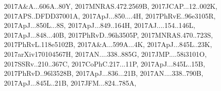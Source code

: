 \documentclass[12pt]{article}
\begin{document}
\begin{description}
{2017A&A...606A..80Y,%
2017MNRAS.472.2569B,%
2017JCAP...12..002K,%
2017APS..DFDD37001A,%
2017ApJ...850....4H,%
2017PhRvE..96e3105R,%
2017ApJ...850L...8S,%
2017ApJ...849..164H,%
2017AJ....154..146L,%
2017ApJ...848...40B,%
2017PhRvD..96h3505P,%
2017MNRAS.470..723S,%
2017PhRvL.118e5102B,%
2017A&A...599A...4K,%
2017ApJ...845L..23K,%
2017arXiv170104567H,%
2017AN....338..885G,%
2017JMP....58i3101O,%
2017SSRv..210..367C,%
2017CoPhC.217...11P,%
2017ApJ...845L..15B,%
2017PhRvD..96l3528B,%
2017ApJ...836...21B,%
2017AN....338..790B,%
2017ApJ...845L..21B,%
2017JFM...824..785A,%
}
\end{description}
\end{document}
